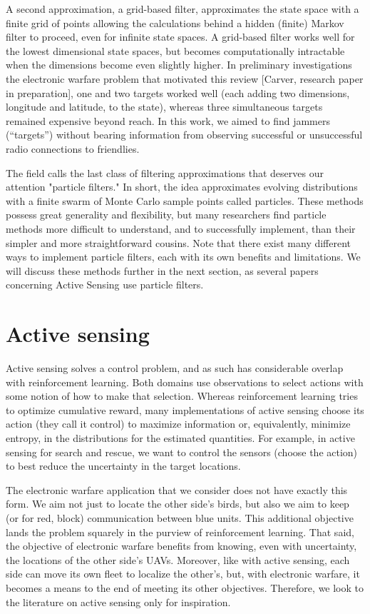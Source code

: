 \documentclass{article}
\begin{document}
A second approximation, a grid-based filter, approximates the state
space with a finite grid of points allowing the calculations behind a
hidden (finite) Markov filter to proceed, even for infinite state
spaces.  A grid-based filter works well for the lowest dimensional
state spaces, but becomes computationally intractable when the
dimensions become even slightly higher.  In preliminary investigations
the electronic warfare problem that motivated this review [Carver,
research paper in preparation], one and two targets worked well (each
adding two dimensions, longitude and latitude, to the state), whereas
three simultaneous targets remained expensive beyond reach.  In this
work, we aimed to find jammers (``targets'') without bearing
information from observing successful or unsuccessful radio
connections to friendlies.

The field calls the last class of filtering approximations that
deserves our attention "particle filters."  In short, the idea
approximates evolving distributions with a finite swarm of Monte Carlo
sample points called particles.  These methods possess great
generality and flexibility, but many researchers find particle methods
more difficult to understand, and to successfully implement, than
their simpler and more straightforward cousins.  Note that there exist
many different ways to implement particle filters, each with its own
benefits and limitations.  We will discuss these methods further in
the next section, as several papers concerning Active Sensing use
particle filters.

\section{Active sensing}

Active sensing solves a control problem, and as such has considerable
overlap with reinforcement learning.  Both domains use observations to
select actions with some notion of how to make that selection.
Whereas reinforcement learning tries to optimize cumulative reward,
many implementations of active sensing choose its action (they call it
control) to maximize information or, equivalently, minimize entropy,
in the distributions for the estimated quantities.  For example, in
active sensing for search and rescue, we want to control the sensors
(choose the action) to best reduce the uncertainty in the target
locations.

The electronic warfare application that we consider does not have
exactly this form.  We aim not just to locate the other side's birds,
but also we aim to keep (or for red, block) communication between blue
units.  This additional objective lands the problem squarely in the
purview of reinforcement learning.  That said, the objective of
electronic warfare benefits from knowing, even with uncertainty, the
locations of the other side's UAVs.  Moreover, like with active
sensing, each side can move its own fleet to localize the other's, but,
with electronic warfare, it becomes a means to the end of meeting its
other objectives.  Therefore, we look to the literature on active
sensing only for inspiration.
\end{document}
